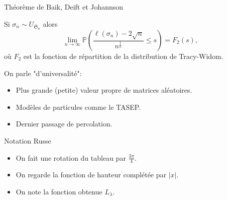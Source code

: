 \documentclass[english]{beamer}
\begin{document}
\begin{frame}{Théorème de Baik, Deift et Johannson}
    \begin{theorem} 
Si $\sigma_n \sim U_{\mathfrak{S}_n}$ alors
\begin{equation*} 
\lim_{n \to \infty} \mathbb{P}\left(\frac{\ell(\sigma_n)-2\sqrt{n}}{n^\frac 16}\leq s\right)=F_2(s),
\end{equation*}
o\`u  $F_2$ est la fonction de répartition de la distribution de Tracy-Widom.
\end{theorem}
\vspace{10 mm}

On parle "d'universalité":
\begin{itemize}
    \item Plus grande (petite) valeur propre de matrices aléatoires.
    \item Modèles de particules comme le TASEP.        \item Dernier passage de percolation.

\end{itemize}
\end{frame}

\begin{frame}{Notation Russe}
\begin{itemize}
    \item On fait une rotation du tableau par $\frac{3\pi}{4}$.
    \item On regarde la fonction de hauteur complétée par $|x|$.
    \item On note la fonction obtenue $L_\lambda$.
\end{itemize}
\end{frame}
\end{document}
